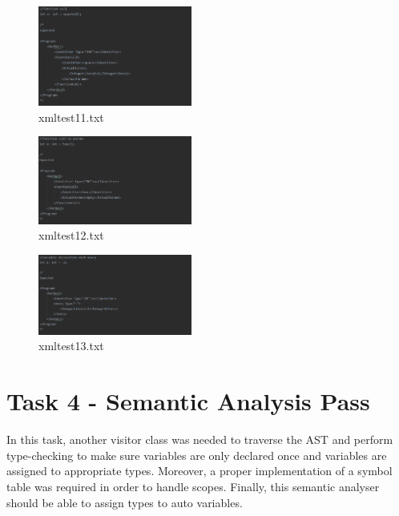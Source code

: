 \documentclass{article}
\begin{document}
\begin{multicols}{2}
			
					
					\begin{figure}[H]
					\centering
			 			\includegraphics[width=0.45\textwidth]{xmltest11.png}
			 			\centering
			  			\caption{xmltest11.txt}
			  			\label{fig:xmltest11}
					\end{figure}
					
					\begin{figure}[H]
					\centering
			 			\includegraphics[width=0.45\textwidth]{xmltest12.png}
			 			 \centering
			  			\caption{xmltest12.txt}
			  			\label{fig:xmltest12}
					\end{figure}
					
					\begin{figure}[H]
					\centering
			 			\includegraphics[width=0.45\textwidth]{xmltest13.png}
			 			\centering
			  			\caption{xmltest13.txt}
			  			\label{fig:xmltest13}
					\end{figure}
					
			\end{multicols}
			
			\section{Task 4 - Semantic Analysis Pass}
			
			In this task, another visitor class was needed to traverse the AST and perform type-checking to make sure variables are only declared once and variables are assigned to appropriate types. Moreover, a proper implementation of a symbol table was required in order to handle scopes. Finally, this semantic analyser should be able to assign types to auto variables.
			
\end{document}
